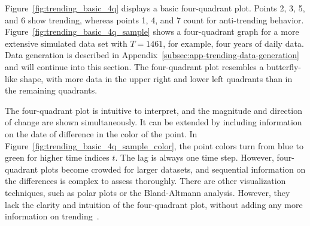 Figure~\ref{fig:trending_basic_4q} displays a basic four-quadrant plot.
Points 2, 3, 5, and 6 show trending, whereas points 1, 4, and 7 count for anti-trending behavior.
Figure~\ref{fig:trending_basic_4q_sample} shows a four-quadrant graph for a more extensive simulated data set with $T=1461$, for example, four years of daily data.
Data generation is described in Appendix~\ref{subsec:app-trending-data-generation} and will continue into this section.
The four-quadrant plot resembles a butterfly-like shape, with more data in the upper right and lower left quadrants than in the remaining quadrants.

The four-quadrant plot is intuitive to interpret, and the magnitude and direction of change are shown simultaneously.
It can be extended by including information on the date of difference in the color of the point.
In Figure~\ref{fig:trending_basic_4q_sample_color}, the point colors turn from blue to green for higher time indices $t$.
The lag is always one time step.
However, four-quadrant plots become crowded for larger datasets, and sequential information on the differences is complex to assess thoroughly.
There are other visualization techniques, such as polar plots or the Bland-Altmann analysis.
However, they lack the clarity and intuition of the four-quadrant plot, without adding any more information on trending~\parencite{Saugel2015}.

